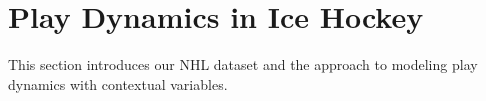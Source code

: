 \documentclass{article}
\newcommand{\latentvariables}{\mathbf{z}}
\newcommand{\hiddenstate}{\mathbf{h}}
\newcommand{\state}{\mathbf{s}}
\newcommand{\action}{\mathbf{a}}
\newcommand{\player}{pl}
\begin{document}



\section{Play Dynamics in Ice Hockey}
This section introduces our NHL dataset and the approach to modeling play dynamics with contextual variables.
\end{document}
